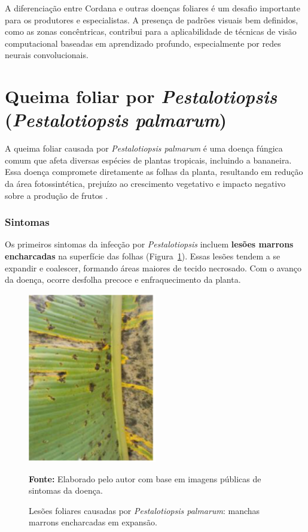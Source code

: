 A diferenciação entre Cordana e outras doenças foliares é um desafio importante para os produtores e especialistas. A presença de padrões visuais bem definidos, como as zonas concêntricas, contribui para a aplicabilidade de técnicas de visão computacional baseadas em aprendizado profundo, especialmente por redes neurais convolucionais.


\section{Queima foliar por \textit{Pestalotiopsis} (\textit{Pestalotiopsis palmarum})}

A queima foliar causada por \textit{Pestalotiopsis palmarum} é uma doença fúngica comum que afeta diversas espécies de plantas tropicais, incluindo a bananeira. Essa doença compromete diretamente as folhas da planta, resultando em redução da área fotossintética, prejuízo ao crescimento vegetativo e impacto negativo sobre a produção de frutos \cite{pestalotiopsis2020}.

\subsubsection*{Sintomas}

Os primeiros sintomas da infecção por \textit{Pestalotiopsis} incluem \textbf{lesões marrons encharcadas} na superfície das folhas (Figura~\ref{fig:pestalotiopsis}). Essas lesões tendem a se expandir e coalescer, formando áreas maiores de tecido necrosado. Com o avanço da doença, ocorre desfolha precoce e enfraquecimento da planta.

\begin{figure}[h]
    \centering
    \includegraphics[width=0.5\textwidth]{figuras/capitulo 3/Pestalotiopsis.png}
    \caption{Lesões foliares causadas por \textit{Pestalotiopsis palmarum}: manchas marrons encharcadas em expansão.}
    \label{fig:pestalotiopsis}
    \small{\textbf{Fonte:} Elaborado pelo autor com base em imagens públicas de sintomas da doença.}
\end{figure}

